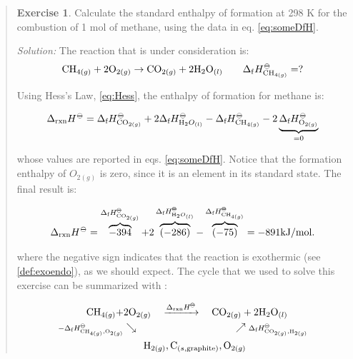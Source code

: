 \documentclass[
  9pt,
]{extbook}
\theoremstyle{definition}
\theoremstyle{definition}
\theoremstyle{definition}
\newtheorem{exercise}{Exercise}[chapter]
\theoremstyle{definition}
\theoremstyle{remark}
\begin{document}
\begin{quote}
\begin{exercise}
\protect\hypertarget{exr:HessLawEx}{}\label{exr:HessLawEx}Calculate the standard enthalpy of formation at 298 K for the combustion of 1 mol of methane, using the data in eq. \eqref{eq:someDfH}.

\emph{Solution:} The reaction that is under consideration is:
\begin{equation}
  \mathrm{CH}_{4(g)} + 2 \mathrm{O}_{2(g)} \rightarrow \mathrm{CO}_{2(g)} + 2 \mathrm{H}_2 \mathrm{O}_{(l)} \qquad \Delta_{\mathrm{f}} H_{\mathrm{CH}_{4(g)}}^{-\kern-6pt{\ominus}\kern-6pt-}= ?
\end{equation}

Using Hess's Law, \eqref{eq:Hess}, the enthalpy of formation for methane is:

\begin{equation}
 \Delta_{\text{rxn}} H^{-\kern-6pt{\ominus}\kern-6pt-}=  \Delta_{\text{f}} H^{-\kern-6pt{\ominus}\kern-6pt-}_{\mathrm{CO}_{2(g)}} + 2 \Delta_{\text{f}} H^{-\kern-6pt{\ominus}\kern-6pt-}_{\mathrm{H}_{2}O_{(l)}} - \Delta_{\text{f}} H^{-\kern-6pt{\ominus}\kern-6pt-}_{\mathrm{CH}_{4(g)}} - 2 \underbrace{\Delta_{\text{f}} H^{-\kern-6pt{\ominus}\kern-6pt-}_{\mathrm{O}_{2(g)}}}_{=0}
\end{equation}

whose values are reported in eqs. \eqref{eq:someDfH}. Notice that the formation enthalpy of \(O_{2(g)}\) is zero, since it is an element in its standard state. The final result is:

\begin{equation}
 \Delta_{\text{rxn}} H^{-\kern-6pt{\ominus}\kern-6pt-}=  \overbrace{-394}^{\Delta_{\text{f}} H^{-\kern-6pt{\ominus}\kern-6pt-}_{\mathrm{CO}_{2(g)}}} +2 \overbrace{(-286)}^{\Delta_{\text{f}} H^{-\kern-6pt{\ominus}\kern-6pt-}_{\mathrm{H}_{2}O_{(l)}}} - \overbrace{(-75)}^{\Delta_{\text{f}} H^{-\kern-6pt{\ominus}\kern-6pt-}_{\mathrm{CH}_{4(g)}}}  = -891 \mathrm{kJ/mol}.
\end{equation}

where the negative sign indicates that the reaction is exothermic (see \ref{def:exoendo}), as we should expect. The cycle that we used to solve this exercise can be summarized with :

\begin{equation}
\begin{aligned}
\mathrm{CH}_{4(g)} + & 2 \mathrm{O}_{2(g)} \quad \xrightarrow{\Delta_{\text{rxn}} H^{-\kern-6pt{\ominus}\kern-6pt-}} \quad \mathrm{CO}_{2(g)} + 2 \mathrm{H}_2 \mathrm{O}_{(l)} \\
  \scriptstyle{-\Delta_{\text{f}} H_{\mathrm{CH}_{4(g)},\mathrm{O}_{2(g)}}^{-\kern-6pt{\ominus}\kern-6pt-}} & \searrow \qquad \qquad \qquad \qquad \qquad \nearrow \; \scriptstyle{\Delta_{\text{f}} H_{\text{CO}_{2(g)},\mathrm{H}_{2(g)}}^{-\kern-6pt{\ominus}\kern-6pt-}}\\
  & \qquad \mathrm{H}_{2(g)}, \mathrm{C}_{(s,\text{graphite})}, \mathrm{O}_{2(g)}
\end{aligned}
\end{equation}


\end{exercise}
\end{quote}
\end{document}
